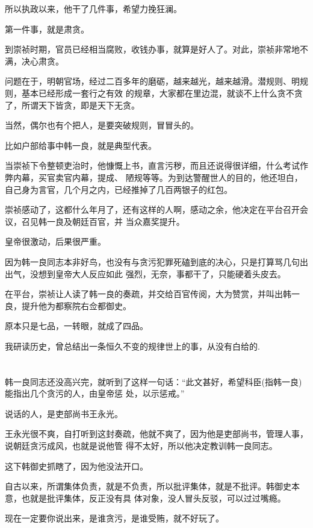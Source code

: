 \documentclass[11pt,a4paper,onecolumn]{article}
\begin{document}
所以执政以来，他干了几件事，希望力挽狂澜。

第一件事，就是肃贪。

到崇祯时期，官员已经相当腐败，收钱办事，就算是好人了。对此，崇祯非常地不满，决心肃贪。

问题在于，明朝官场，经过二百多年的磨砺，越来越光，越来越滑。潜规则、明规则，基本已经形成一套行之有效
的规章，大家都在里边混，就谈不上什么贪不贪了，所谓天下皆贪，即是天下无贪。

当然，偶尔也有个把人，是要突破规则，冒冒头的。

比如户部给事中韩一良，就是典型代表。

当崇祯下令整顿吏治时，他慷慨上书，直言污秽，而且还说得很详细，什么考试作弊内幕，买官卖官内幕，提成、
陋规等等。为到达警醒世人的目的，他还坦白，自己身为言官，几个月之内，已经推掉了几百两银子的红包。

崇祯感动了，这都什么年月了，还有这样的人啊，感动之余，他决定在平台召开会议，召见韩一良及朝廷百官，并
当众嘉奖提升。

皇帝很激动，后果很严重。

因为韩一良同志本非好鸟，也没有与贪污犯罪死磕到底的决心，只是打算骂几句出出气，没想到皇帝大人反应如此
强烈，无奈，事都干了，只能硬着头皮去。

在平台，崇祯让人读了韩一良的奏疏，并交给百官传阅，大为赞赏，并叫出韩一良，提升他为都察院右佥都御史。

原本只是七品，一转眼，就成了四品。

我研读历史，曾总结出一条恒久不变的规律\myrule 世上的事，从没有白给的.

\section[\thesection]{}

韩一良同志还没高兴完，就听到了这样一句话：``此文甚好，希望科臣(指韩一良)能指出几个贪污的人，由皇帝惩
处，以示惩戒。''

说话的人，是吏部尚书王永光。

王永光很不爽，自打听到这封奏疏，他就不爽了，因为他是吏部尚书，管理人事，说朝廷贪污成风，也就是说他管
得不太好，所以他决定教训韩一良同志。

这下韩御史抓瞎了，因为他没法开口。

自古以来，所谓集体负责，就是不负责，所以批评集体，就是不批评。韩御史本意，也就是批评集体，反正没有具
体对象，没人冒头反驳，可以过过嘴瘾。

现在一定要你说出来，是谁贪污，是谁受贿，就不好玩了。
\end{document}
